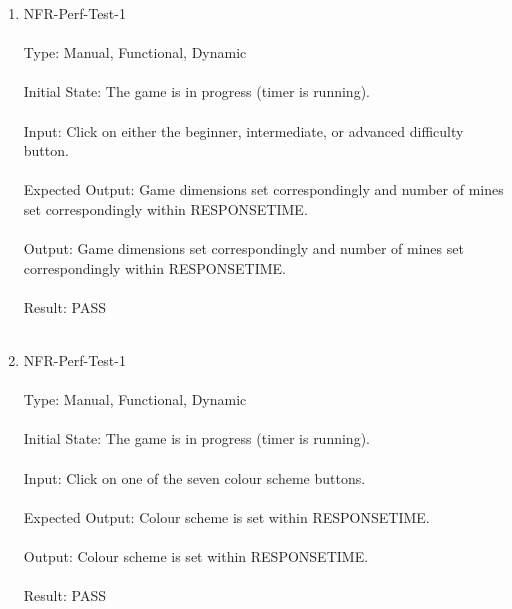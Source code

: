 \documentclass[12pt, titlepage]{article}
\begin{document}
\begin{enumerate}
\newpage
\item{NFR-Perf-Test-1\\\\}
Type: Manual, Functional, Dynamic\\\\				
Initial State: The game is in progress (timer is running).\\\\
Input: Click on either the beginner, intermediate, or advanced difficulty button.\\\\
Expected Output: Game dimensions set correspondingly and number of mines set correspondingly within RESPONSETIME.\\\\
Output: Game dimensions set correspondingly and number of mines set correspondingly within RESPONSETIME.\\\\
Result: PASS\\\\

\item{NFR-Perf-Test-1\\\\}
Type: Manual, Functional, Dynamic\\\\				
Initial State: The game is in progress (timer is running).\\\\
Input: Click on one of the seven colour scheme buttons.\\\\
Expected Output: Colour scheme is set within RESPONSETIME.\\\\
Output: Colour scheme is set within RESPONSETIME.\\\\
Result: PASS\\\\

\end{enumerate}

\newpage
\end{document}
